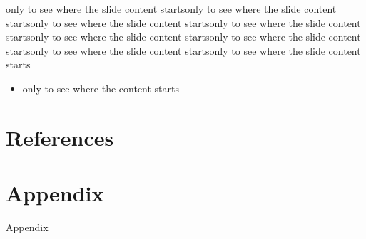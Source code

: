 \documentclass[fleqn,compress,utf8,aspectratio=169,t,handout]{beamer}
\begin{document}
\begin{frame}
only to see where the slide content startsonly to see where the slide content startsonly to see where the slide content startsonly to see where the slide content startsonly to see where the slide content startsonly to see where the slide content startsonly to see where the slide content startsonly to see where the slide content starts
\begin{itemize}
	\item only to see where the content starts
\end{itemize}

\end{frame}




\section{References}

\begin{frame}[allowframebreaks]
\printbibliography
\end{frame}

\appendix

\section{Appendix}
\begin{frame}[noframenumbering]
Appendix
\end{frame}
\end{document}
